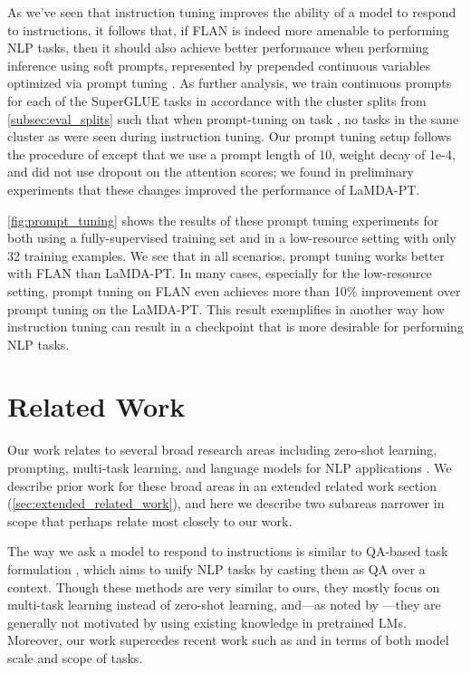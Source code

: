\documentclass{article} \usepackage{iclr2022_conference,times}
\newcommand{\flan}{FLAN}
\newcommand{\baselm}{LaMDA-PT}
\begin{document}
As we've seen that instruction tuning improves the ability of a model to respond to instructions, it follows that, if \flan{} is indeed more amenable to performing NLP tasks, then it should also achieve better performance when performing inference using soft prompts, represented by prepended continuous variables optimized via prompt tuning \citep{li-liang-2021-prefix,lester-prompt-tuning}.
As further analysis, we train continuous prompts for each of the SuperGLUE \citep{wang2019superglue} tasks in accordance with the cluster splits from \cref{subsec:eval_splits} such that when prompt-tuning on task , no tasks in the same cluster as  were seen during instruction tuning.
Our prompt tuning setup follows the procedure of \citet{lester-prompt-tuning} except that we use a prompt length of 10, weight decay of 1e-4, and did not use dropout on the attention scores; we found in preliminary experiments that these changes improved the performance of \baselm. 

\cref{fig:prompt_tuning} shows the results of these prompt tuning experiments for both using a fully-supervised training set and in a low-resource setting with only 32 training examples.
We see that in all scenarios, prompt tuning works better with \flan{} than \baselm.
In many cases, especially for the low-resource setting, prompt tuning on \flan{} even achieves more than 10\% improvement over prompt tuning on the \baselm. 
This result exemplifies in another way how instruction tuning can result in a checkpoint that is more desirable for performing NLP tasks.





\section{Related Work}
Our work relates to several broad research areas including zero-shot learning, prompting, multi-task learning, and language models for NLP applications \citep[][\textit{inter alia}]{radford2019language,raffel2019exploring,brown2020language,efrat2020turking,aghajanyan2021muppet,li-liang-2021-prefix}.
We describe prior work for these broad areas in an extended related work section (\cref{sec:extended_related_work}), and here we describe two subareas narrower in scope that perhaps relate most closely to our work.

The way we ask a model to respond to instructions is similar to QA-based task formulation \citep{kumar2016ask,mccann2018natural}, which aims to unify NLP tasks by casting them as QA over a context.
Though these methods are very similar to ours, they mostly focus on multi-task learning instead of zero-shot learning, and---as noted by \citet{liu2021survey}---they are generally not motivated by using existing knowledge in pretrained LMs.
Moreover, our work supercedes recent work such as \citet{chai2020description} and \citet{zhong2021meta} in terms of both model scale and scope of tasks.
\end{document}

